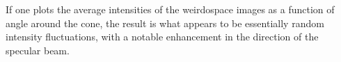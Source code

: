 If one plots the average intensities of the weirdospace images as a
function of angle around the cone, the result is what appears to be
essentially random intensity fluctuations, with a notable enhancement in
the direction of the specular beam.  

